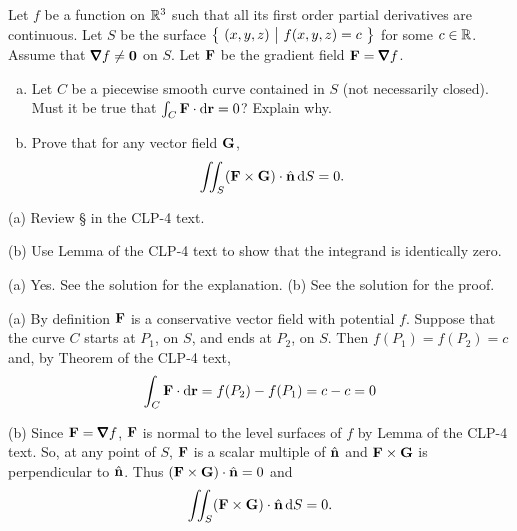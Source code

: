 \begin{question}[M317 2011D] %
Let $f$ be a function on $\mathbb{R}^3$ such that all its first order 
partial derivatives are continuous. Let $S$ be the surface 
$\big\{ \ (x, y, z)\ \big|\ f(x,y,z) = c\ \big\}$ for some $c \in \mathbb{R}$. 
Assume that $\vnabla f \ne \vZero$ on $S$. Let $\mathbf{F}$ be the gradient field 
$\vF = \vnabla f$.

\begin{enumerate}[(a)]
\item
Let $C$ be a piecewise smooth curve contained in $S$ 
(not necessarily closed).
Must it be true that $\int_C \mathbf{F} \cdot \mathrm{d}\mathbf{r} = 0$? Explain why.
\item
Prove that for any vector field $\mathbf{G}$,
\begin{equation*}
\iint_S (\mathbf{F} \times \mathbf{G}) \cdot\hat{\mathbf{n}}\, \mathrm{d}S = 0.
\end{equation*}
\end{enumerate}
\end{question}

\begin{hint} 
(a) Review \S{} in the CLP-4 text.

(b) Use Lemma  of the CLP-4 text 
to show that the integrand is identically zero.

\end{hint}

\begin{answer} 
(a) Yes. See the solution for the explanation.\qquad
(b) See the solution for the proof.
\end{answer}

\begin{solution} (a) By definition $\mathbf{F}$ is a conservative vector field with
potential $f$. Suppose that the curve $C$ starts at $P_1$, on $S$, and
ends at $P_2$, on $S$. Then $f(P_1)=f(P_2)=c$ and, by 
Theorem  of the CLP-4 text,
\begin{equation*}
\int_C \mathbf{F} \cdot \mathrm{d}\mathbf{r} 
= f(P_2) - f(P_1)
=c - c
=0
\end{equation*}

\noindent (b) Since $\vF=\vnabla f$, $\mathbf{F}$ is normal to the level surfaces
of $f$ by Lemma  of the CLP-4 text. 
So, at any point of $S$,
$\mathbf{F}$ is a scalar multiple of $\hat{\mathbf{n}}$ and $\mathbf{F}\times\mathbf{G}$ is perpendicular to
$\hat{\mathbf{n}}$. Thus $(\mathbf{F} \times \mathbf{G}) \cdot\hat{\mathbf{n}}=0$ and
\begin{equation*}
\iint_S (\mathbf{F} \times \mathbf{G}) \cdot\hat{\mathbf{n}}\, \mathrm{d}S = 0.
\end{equation*}
\end{solution}

